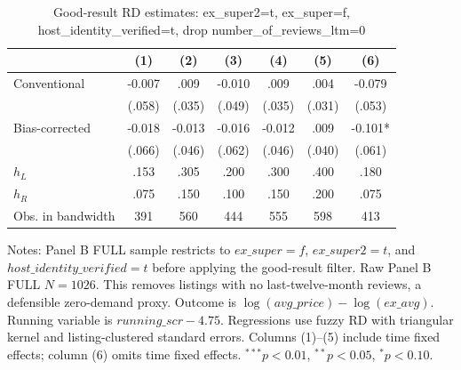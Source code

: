 \begin{table}[!htbp]
\centering
\caption{Good-result RD estimates: ex\_super2=t, ex\_super=f, host\_identity\_verified=t, drop number\_of\_reviews\_ltm=0}
\label{tab:good_result_drop_number_reviews_ltm0}
\begin{tabular}{lcccccc}
\hline
 & (1) & (2) & (3) & (4) & (5) & (6)
\\
\hline
Conventional & -0.007 & .009 & -0.010 & .009 & .004 & -0.079
\\
 & (.058) & (.035) & (.049) & (.035) & (.031) & (.053)
\\
Bias-corrected & -0.018 & -0.013 & -0.016 & -0.012 & .009 & -0.101*
\\
 & (.066) & (.046) & (.062) & (.046) & (.040) & (.061)
\\
$h_L$ & .153 & .305 & .200 & .300 & .400 & .180
\\
$h_R$ & .075 & .150 & .100 & .150 & .200 & .075
\\
Obs. in bandwidth & 391 & 560 & 444 & 555 & 598 & 413
\\
\hline
\end{tabular}
\begin{flushleft}
\footnotesize Notes: Panel B FULL sample restricts to $ex\_super=f$, $ex\_super2=t$, and $host\_identity\_verified=t$ before applying the good-result filter. Raw Panel B FULL $N=1026$. This removes listings with no last-twelve-month reviews, a defensible zero-demand proxy. Outcome is $\log(avg\_price)-\log(ex\_avg)$. Running variable is $running\_scr-4.75$. Regressions use fuzzy RD with triangular kernel and listing-clustered standard errors. Columns (1)--(5) include time fixed effects; column (6) omits time fixed effects. $^{***}p<0.01$, $^{**}p<0.05$, $^{*}p<0.10$.
\end{flushleft}
\end{table}

